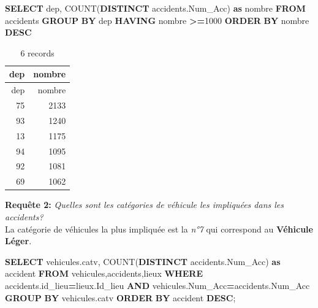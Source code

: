 \documentclass[mstat,12pt]{unswthesis}
\newenvironment{Shaded}{\begin{snugshade}}{\end{snugshade}}
\newcommand{\DecValTok}[1]{\textcolor[rgb]{0.00,0.00,0.81}{#1}}
\newcommand{\FunctionTok}[1]{\textcolor[rgb]{0.00,0.00,0.00}{#1}}
\newcommand{\KeywordTok}[1]{\textcolor[rgb]{0.13,0.29,0.53}{\textbf{#1}}}
\newcommand{\NormalTok}[1]{#1}
\newcommand{\OperatorTok}[1]{\textcolor[rgb]{0.81,0.36,0.00}{\textbf{#1}}}
\begin{document}
\begin{Shaded}
\begin{Highlighting}[]
\KeywordTok{SELECT}\NormalTok{ dep, }\FunctionTok{COUNT}\NormalTok{(}\KeywordTok{DISTINCT}\NormalTok{ accidents.Num\_Acc) }\KeywordTok{as}\NormalTok{ nombre}
\KeywordTok{FROM}\NormalTok{ accidents }
\KeywordTok{GROUP} \KeywordTok{BY}\NormalTok{ dep}
\KeywordTok{HAVING}\NormalTok{ nombre }\OperatorTok{\textgreater{}=}\DecValTok{1000}
\KeywordTok{ORDER} \KeywordTok{BY}\NormalTok{ nombre }\KeywordTok{DESC}
\end{Highlighting}
\end{Shaded}

\begin{longtable}[]{@{}rr@{}}
\caption{6 records}\tabularnewline
\toprule()
dep & nombre \\
\midrule()
\endfirsthead
\toprule()
dep & nombre \\
\midrule()
\endhead
75 & 2133 \\
93 & 1240 \\
13 & 1175 \\
94 & 1095 \\
92 & 1081 \\
69 & 1062 \\
\bottomrule()
\end{longtable}

\medskip

\textbf{Requête 2:} \emph{Quelles sont les catégories de véhicule les
impliquées dans les accidents?}\\
La catégorie de véhicules la plus impliquée est la \emph{n°7} qui
correspond au \textbf{Véhicule Léger}.

\begin{Shaded}
\begin{Highlighting}[]
\KeywordTok{SELECT}\NormalTok{ vehicules.catv, }\FunctionTok{COUNT}\NormalTok{(}\KeywordTok{DISTINCT}\NormalTok{ accidents.Num\_Acc) }\KeywordTok{as}\NormalTok{ accident}
\KeywordTok{FROM}\NormalTok{ vehicules,accidents,lieux}
\KeywordTok{WHERE}\NormalTok{ accidents.id\_lieu}\OperatorTok{=}\NormalTok{lieux.Id\_lieu}
\KeywordTok{AND}\NormalTok{ vehicules.Num\_Acc}\OperatorTok{=}\NormalTok{accidents.Num\_Acc}
\KeywordTok{GROUP} \KeywordTok{BY}\NormalTok{ vehicules.catv}
\KeywordTok{ORDER} \KeywordTok{BY}\NormalTok{ accident }\KeywordTok{DESC}\NormalTok{;}
\end{Highlighting}
\end{Shaded}
\end{document}
